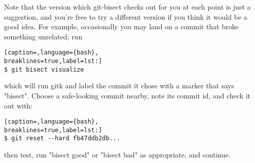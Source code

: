 Note that the version which git-bisect checks out for you at each point is just
a suggestion, and you're free to try a different version if you think it would
be a good idea. For example, occasionally you may land on a commit that broke
something unrelated; run
\lstset{basicstyle=\scriptsize, numbers=none, captionpos=b, tabsize=4}
\begin{lstlisting}[caption=,language={bash},
breaklines=true,label=lst:]
$ git bisect visualize
\end{lstlisting}

which will run gitk and label the commit it chose with a marker that says
"bisect". Choose a safe-looking commit nearby, note its commit id, and check it
out with:
\lstset{basicstyle=\scriptsize, numbers=none, captionpos=b, tabsize=4}
\begin{lstlisting}[caption=,language={bash},
breaklines=true,label=lst:]
$ git reset --hard fb47ddb2db...
\end{lstlisting}

then test, run "bisect good" or "bisect bad" as appropriate, and continue.
